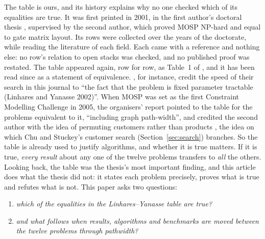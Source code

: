 The table is ours, and its history explains why no one checked which of its
equalities are true. It was first printed in 2001, in the first author's
doctoral thesis \citep[Table~2.1, p.~13]{Linhares2001}, supervised by the
second author, which proved MOSP NP-hard and equal to gate matrix layout. Its
rows were collected over the years of the doctorate, while reading the
literature of each field. Each came with a reference and nothing else: no
row's relation to open stacks was checked, and no published proof was
restated. The table appeared again, row for row, as Table~1 of \citet{LY2002},
and it has been read since as a statement of equivalence.
\citet{GarciaDeLaBandaStuckey2007}, for instance, credit the speed of their
search in this journal to ``the fact that the problem is fixed parameter
tractable (Linhares and Yanasse 2002)''. When MOSP was set as the first
Constraint Modelling Challenge in 2005, the organisers' report pointed to the
table for the problems equivalent to it, ``including graph path-width'', and
credited the second author with the idea of permuting customers rather than
products \citep{SmithGent2005,Yanasse1997b}, the idea on which Chu and
Stuckey's customer search (Section~\ref{sec:search}) branches. So the table is
already used to justify algorithms, and whether it is true matters. If it is
true, \emph{every result} about any one of the twelve problems transfers to
\emph{all} the others. Looking back, the table was the thesis's most important
finding, and this article does what the thesis did not: it states each problem
precisely, proves what is true and refutes what is not. This paper asks two questions:
\begin{enumerate}
\item \emph{which of the equalities in the Linhares--Yanasse table are true?}
\item \emph{and what follows when results, algorithms and benchmarks are moved
  between the twelve problems through pathwidth?}
\end{enumerate}


